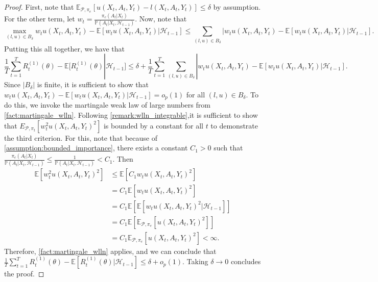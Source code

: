 \documentclass[11pt]{article}
\begin{document}
\begin{appendix}
\begin{proof}
First, note that $\mathbb{E}_{\mathcal{P},\pi_{e}} \left[ u(X_t,A_t,Y_t) - l(X_t,A_t,Y_t)\right] \le \delta$ by assumption. For the other term, let $w_{t} =\frac{\pi_{e}(A_{t} | X_{t})}{\mathbb{P} \left(A_{t} | X_{t},\mathcal{H}_{t-1} \right) } $. Now, note that 
$$\max_{(l,u) \in B_{\delta}}  w_{t} u(X_t,A_t,Y_t)  - \mathbb{E}\left[w_{t} u(X_t,A_t,Y_t) | \mathcal{H}_{t-1} \right] \le \sum_{(l,u) \in B_{\delta}} | w_{t} u(X_t,A_t,Y_t)  - \mathbb{E}\left[w_{t} u(X_t,A_t,Y_t) | \mathcal{H}_{t-1} \right].$$
Putting this all together, we have that
$$\frac{1}{T} \sum_{t=1}^{T} R^{(1)}_t(\theta) - \mathbb{E}[R^{(1)}_t(\theta) | \mathcal{H}_{t-1}]  \le \delta + \frac{1}{T}\sum_{t=1}^{T} \sum_{(l,u) \in B_{\delta}}  | w_{t} u(X_t,A_t,Y_t)  - \mathbb{E}\left[w_{t} u(X_t,A_t,Y_t) | \mathcal{H}_{t-1} \right].$$
Since $|B_{\delta}|$ is finite, it is sufficient to show that $w_{t} u(X_t,A_t,Y_t)  - \mathbb{E}\left[w_{t} u(X_t,A_t,Y_t) |\mathcal{H}_{t-1}\right] = o_{p}(1)$ for all $(l,u) \in B_{\delta}$. To do this, we invoke the martingale weak law of large numbers from \cref{fact:martingale_wlln}. Following \cref{remark:wlln_integrable},it is sufficient to show that $E_{\mathcal{P},\pi_{t}}[w_{t}^{2} u(X_t,A_t,Y_t)^{2}]$ is bounded by a constant for all $t$ to demonstrate the third criterion. For this, note that because of \cref{assumption:bounded_importance}, there exists a constant $C_1 > 0$ such that $\frac{\pi_{e}(A_{t} | X_{t})}{\mathbb{P} \left(A_{t} | X_{t},\mathcal{H}_{t-1} \right) } \le \frac{1}{\mathbb{P} \left(A_{t} | X_{t},\mathcal{H}_{t-1} \right) } < C_{1}$. Then
\begin{align*}
    \mathbb{E}[w_{t}^{2} u(X_t,A_t,Y_t)^{2}] &\le \mathbb{E}[C_{1} w_{t} u(X_t,A_t,Y_t)^{2}] \\
    &= C_{1}\mathbb{E}[ w_{t} u(X_t,A_t,Y_t)^{2}]\\
    &= C_{1} \mathbb{E}[\mathbb{E}[ w_{t} u(X_t,A_t,Y_t)^{2} |\mathcal{H}_{t-1}]] \\
    &= C_{1} \mathbb{E}[\mathbb{E}_{\mathcal{P},\pi_e}[ u(X_t,A_t,Y_t)^{2}]] \\
    &= C_{1} \mathbb{E}_{\mathcal{P},\pi_e}[ u(X_t,A_t,Y_t)^{2}] < \infty.
\end{align*}
Therefore, \cref{fact:martingale_wlln} applies, and we can conclude that 
$\frac{1}{T} \sum_{t=1}^{T} R^{(1)}_t(\theta) - \mathbb{E}[R^{(1)}_t(\theta) | \mathcal{H}_{t-1}]  \le \delta + o_{p}(1)$. Taking $\delta \rightarrow 0$ concludes the proof. 


\end{proof}
\end{appendix}
\end{document}
